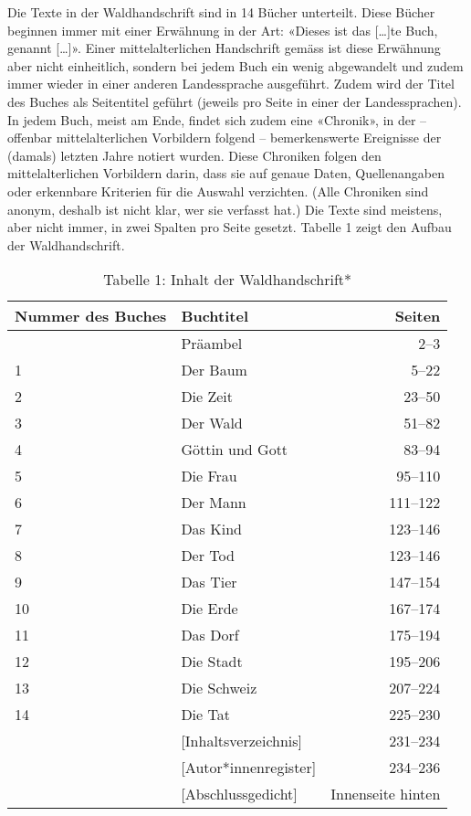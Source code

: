 \documentclass[a4paper,
fontsize=11pt,
oneside,
numbers=noperiodatend,
parskip=half-,
bibliography=totoc,
final
]{scrartcl}
\begin{document}
Die Texte in der Waldhandschrift sind in 14 Bücher unterteilt. Diese
Bücher beginnen immer mit einer Erwähnung in der Art: «Dieses ist das
{[}\ldots{]}te Buch, genannt {[}\ldots{]}». Einer mittelalterlichen
Handschrift gemäss ist diese Erwähnung aber nicht einheitlich, sondern
bei jedem Buch ein wenig abgewandelt und zudem immer wieder in einer
anderen Landessprache ausgeführt. Zudem wird der Titel des Buches als
Seitentitel geführt (jeweils pro Seite in einer der Landessprachen). In
jedem Buch, meist am Ende, findet sich zudem eine «Chronik», in der --
offenbar mittelalterlichen Vorbildern folgend -- bemerkenswerte
Ereignisse der (damals) letzten Jahre notiert wurden. Diese Chroniken
folgen den mittelalterlichen Vorbildern darin, dass sie auf genaue
Daten, Quellenangaben oder erkennbare Kriterien für die Auswahl
verzichten. (Alle Chroniken sind anonym, deshalb ist nicht klar, wer sie
verfasst hat.) Die Texte sind meistens, aber nicht immer, in zwei
Spalten pro Seite gesetzt. Tabelle 1 zeigt den Aufbau der
Waldhandschrift.

\begin{table}
\centering
    \begin{tabular}{llr}
\toprule
\textbf{Nummer des Buches} & \textbf{Buchtitel} & \textbf{Seiten} \\
\midrule
& Präambel & 2--3 \\
1 & Der Baum & 5--22 \\
2 & Die Zeit & 23--50 \\
3 & Der Wald & 51--82 \\
4 & Göttin und Gott & 83--94 \\
5 & Die Frau & 95--110 \\
6 & Der Mann & 111--122 \\
7 & Das Kind & 123--146 \\
8 & Der Tod & 123--146 \\
9 & Das Tier & 147--154 \\
10 & Die Erde & 167--174 \\
11 & Das Dorf & 175--194 \\
12 & Die Stadt & 195--206 \\
13 & Die Schweiz & 207--224 \\
14 & Die Tat & 225--230 \\
& {[}Inhaltsverzeichnis{]} & 231--234 \\
& {[}Autor*innenregister{]} & 234--236 \\
& {[}Abschlussgedicht{]} & Innenseite hinten \\
\bottomrule
\end{tabular}
\caption{Tabelle 1: Inhalt der Waldhandschrift*}\
\end{table}
\end{document}

